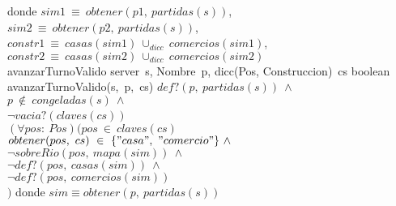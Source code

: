 \begin{Interfaz}
\tab donde $sim1\ \equiv\ obtener(p1,\ partidas(s))$, \\
\tab\tab\tab \: $sim2\ \equiv\ obtener(p2,\ partidas(s))$, \\
\tab\tab\tab \: $constr1\ \equiv\ casas(sim1)\ \cup_{dicc}\ comercios(sim1)$, \\
\tab\tab\tab \: $constr2\ \equiv\ casas(sim2)\ \cup_{dicc}\ comercios(sim2)$
\\

\tadOperacion
    {avanzarTurnoValido}
    {server\ s, Nombre\ p, dicc(Pos, Construccion)\ cs}
    {boolean}
    {}
\tadAxioma
    {avanzarTurnoValido(s,\ p,\ cs)}
    {$
        def?(p,\ partidas(s))\ \land\ $\\$
        p\ \notin\ congeladas(s)\ \land\ $\\$ 
        \neg vacia?(claves(cs))\ $\yluego\ \\$
        (\forall pos:\ Pos)(pos\ \in\ claves(cs)\ $\impluego$ $\\$
            $\tab$ obtener(pos,\ cs)\ \in\ \{"casa",\ "comercio"\}\ \land\ $\\$
            $\tab$ \neg sobreRio(pos,\ mapa(sim))\ \land\ $\\$
            $\tab$ \neg def?(pos,\ casas(sim))\ \land\ $\\$
            $\tab$ \neg def?(pos,\ comercios(sim)) $\\$
        )
    $}
\tab donde $sim \equiv obtener(p,\ partidas(s))$  
\\



    
\end{Interfaz}

\pagebreak